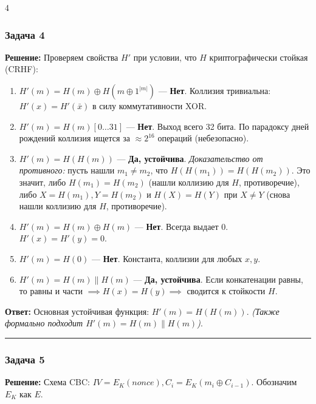 ﻿\documentclass[8pt,a4paper,landscape]{extarticle}
\newcommand{\tightlist}{}
\begin{document}
\begin{multicols*}{4}
\subsubsection{Задача 4}\label{ux437ux430ux434ux430ux447ux430-4}

\textbf{Решение:} Проверяем свойства \(H'\) при условии, что \(H\) криптографически стойкая (CRHF):

\begin{enumerate}
\def\labelenumi{\arabic{enumi}.}
\tightlist
\item
  \(H'(m) = H(m) \oplus H(m \oplus 1^{|m|})\) --- \textbf{Нет}. Коллизия тривиальна: \(H'(x) = H'(\bar{x})\) в силу коммутативности XOR.
\item
  \(H'(m) = H(m)[0\dots31]\) --- \textbf{Нет}. Выход всего 32 бита. По парадоксу дней рождений коллизия ищется за \(\approx 2^{16}\) операций (небезопасно).
\item
  \(H'(m) = H(H(m))\) --- \textbf{Да, устойчива}. \emph{Доказательство от противного:} пусть нашли \(m_1 \neq m_2\), что \(H(H(m_1)) = H(H(m_2))\). Это значит, либо \(H(m_1) = H(m_2)\) (нашли коллизию для \(H\), противоречие), либо \(X = H(m_1), Y = H(m_2)\) и \(H(X) = H(Y)\) при \(X \neq Y\) (снова нашли коллизию для \(H\), противоречие).
\item
  \(H'(m) = H(m) \oplus H(m)\) --- \textbf{Нет}. Всегда выдает 0. \(H'(x) = H'(y) = 0\).
\item
  \(H'(m) = H(0)\) --- \textbf{Нет}. Константа, коллизии для любых \(x, y\).
\item
  \(H'(m) = H(m) \parallel H(m)\) --- \textbf{Да, устойчива}. Если конкатенации равны, то равны и части \(\implies H(x)=H(y) \implies\) сводится к стойкости \(H\).
\end{enumerate}

\textbf{Ответ:} Основная устойчивая функция: \textbf{\(H'(m) = H(H(m))\)}. \emph{(Также формально подходит \(H'(m) = H(m) \parallel H(m)\))}.

\begin{center}\rule{0.5\linewidth}{0.5pt}\end{center}

\subsubsection{Задача 5}\label{ux437ux430ux434ux430ux447ux430-5}

\textbf{Решение:} Схема CBC: \(IV = E_K(nonce), C_i = E_K(m_i \oplus C_{i-1})\). Обозначим \(E_K\) как \(E\).


\end{multicols*}
\end{document}
